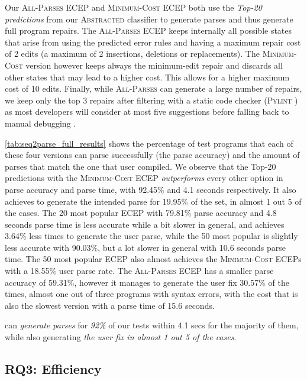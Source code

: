 Our \textsc{All-Parses} ECEP and \textsc{Minimum-Cost} ECEP both use the
\emph{Top-20 predictions} from our \textsc{Abstracted} classifier to generate
parses and thus generate full program repairs. The \textsc{All-Parses} ECEP
keeps internally all possible states that arise from using the predicted error
rules and having a maximum repair cost of 2 edits (\ie a maximum of 2
insertions, deletions or replacements). The \textsc{Minimum-Cost} version
however keeps always the minimum-edit repair and discards all other states that
may lead to a higher cost. This allows for a higher maximum cost of 10 edits.
Finally, while \textsc{All-Parses} can generate a large number of repairs, we
keep only the top 3 repairs after filtering with a static code checker
(\textsc{Pylint} \citep{pylint2022}) as most developers will consider at most five
suggestions before falling back to manual debugging \citep{Kochhar2016-oc,
Parnin2011-ce}.

\autoref{tab:seq2parse_full_results} shows the percentage of test programs that
each of these four versions can parse successfully (\ie the parse accuracy) and
the amount of parses that match the one that user compiled. We observe that the
Top-20 predictions with the \textsc{Minimum-Cost} ECEP \emph{outperforms} every
other option in parse accuracy and parse time, with 92.45\% and 4.1 seconds
respectively. It also achieves to generate the intended parse for 19.95\% of the
set, \ie in almost 1 out 5 of the cases. The 20 most popular ECEP with 79.81\%
parse accuracy and 4.8 seconds parse time is less accurate while a bit slower in
general, and achieves 3.64\% less times to generate the user parse, while the 50
most popular is slightly less accurate with 90.03\%, but a lot slower in general
with 10.6 seconds parse time. The 50 most popular ECEP also almost achieves the
\textsc{Minimum-Cost} ECEPs with a 18.55\% user parse rate. The
\textsc{All-Parses} ECEP has a smaller parse accuracy of 59.31\%, however it
manages to generate the user fix 30.57\% of the times, \ie almost one out of
three programs with syntax errors, with the cost that is also the slowest
version with a parse time of 15.6 seconds.

\begin{framed}
  \noindent \toolname can \emph{generate parses} for \emph{92\%} of our tests
  within 4.1 secs for the majority of them, while also generating \emph{the user
  fix in almost 1 out 5 of the cases}.
\end{framed}

\subsection{RQ3: Efficiency}
\label{sec:eval:efficiency}

